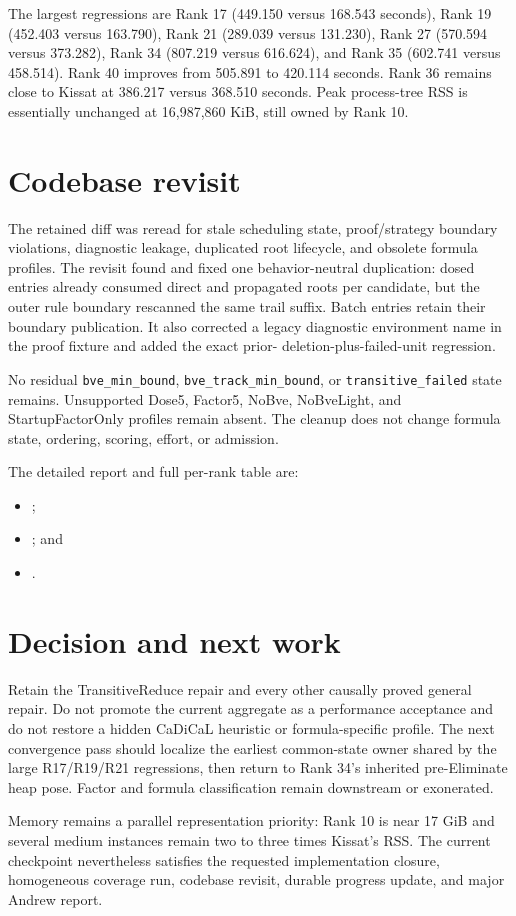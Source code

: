 \documentclass[11pt]{article}
\newcommand{\code}[1]{\texttt{#1}}
\begin{document}
The largest regressions are Rank 17 (449.150 versus 168.543 seconds), Rank 19
(452.403 versus 163.790), Rank 21 (289.039 versus 131.230), Rank 27 (570.594
versus 373.282), Rank 34 (807.219 versus 616.624), and Rank 35 (602.741 versus
458.514).  Rank 40 improves from 505.891 to 420.114 seconds.  Rank 36 remains
close to Kissat at 386.217 versus 368.510 seconds.  Peak process-tree RSS is
essentially unchanged at 16,987,860 KiB, still owned by Rank 10.

\section{Codebase revisit}

The retained diff was reread for stale scheduling state, proof/strategy
boundary violations, diagnostic leakage, duplicated root lifecycle, and
obsolete formula profiles.  The revisit found and fixed one behavior-neutral
duplication: dosed entries already consumed direct and propagated roots per
candidate, but the outer rule boundary rescanned the same trail suffix.  Batch
entries retain their boundary publication.  It also corrected a legacy
diagnostic environment name in the proof fixture and added the exact prior-
deletion-plus-failed-unit regression.

No residual \code{bve\_min\_bound}, \code{bve\_track\_min\_bound}, or
\code{transitive\_failed} state remains.  Unsupported Dose5, Factor5, NoBve,
NoBveLight, and StartupFactorOnly profiles remain absent.  The cleanup does not
change formula state, ordering, scoring, effort, or admission.

The detailed report and full per-rank table are:

\begin{itemize}
\item {};
\item {}; and
\item {}.
\end{itemize}

\section{Decision and next work}

Retain the TransitiveReduce repair and every other causally proved general
repair.  Do not promote the current aggregate as a performance acceptance and
do not restore a hidden CaDiCaL heuristic or formula-specific profile.  The
next convergence pass should localize the earliest common-state owner shared by
the large R17/R19/R21 regressions, then return to Rank 34's inherited
pre-Eliminate heap pose.  Factor and formula classification remain downstream
or exonerated.

Memory remains a parallel representation priority: Rank 10 is near 17 GiB and
several medium instances remain two to three times Kissat's RSS.  The current
checkpoint nevertheless satisfies the requested implementation closure,
homogeneous coverage run, codebase revisit, durable progress update, and major
Andrew report.
\end{document}
